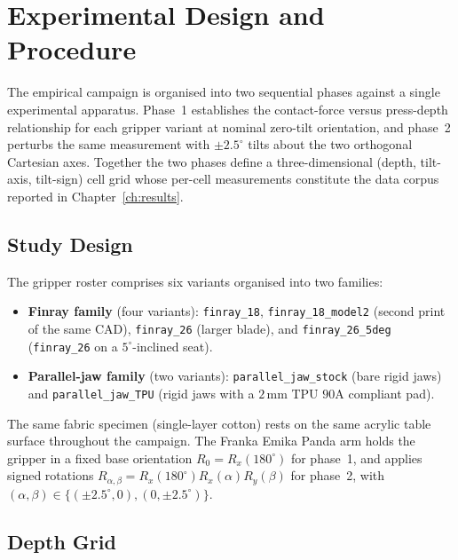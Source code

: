 \chapter{\rm\bfseries Experimental Design and Procedure}
\label{ch:experiments}

The empirical campaign is organised into two sequential phases against a
single experimental apparatus. Phase~1 establishes the contact-force
versus press-depth relationship for each gripper variant at nominal
zero-tilt orientation, and phase~2 perturbs the same measurement with
$\pm 2.5^{\circ}$ tilts about the two orthogonal Cartesian axes.
Together the two phases define a three-dimensional
(depth, tilt-axis, tilt-sign) cell grid whose per-cell measurements
constitute the data corpus reported in Chapter~\ref{ch:results}.

\section{Study Design}
\label{sec:study-design}

The gripper roster comprises six variants organised into two families:
\begin{itemize}
  \item \textbf{Finray family} (four variants):
    \texttt{finray\_18}, \texttt{finray\_18\_model2} (second print of
    the same CAD), \texttt{finray\_26} (larger blade), and
    \texttt{finray\_26\_5deg} (\texttt{finray\_26} on a
    $5^{\circ}$-inclined seat).
  \item \textbf{Parallel-jaw family} (two variants):
    \texttt{parallel\_jaw\_stock} (bare rigid jaws) and
    \texttt{parallel\_jaw\_TPU} (rigid jaws with a $2$\,mm TPU $90$A
    compliant pad).
\end{itemize}

The same fabric specimen (single-layer cotton) rests on the same
acrylic table surface throughout the campaign. The Franka Emika Panda
arm holds the gripper in a fixed base orientation $R_0 = R_x(180^{\circ})$
for phase~1, and applies signed rotations
$R_{\alpha,\beta} = R_x(180^{\circ}) R_x(\alpha) R_y(\beta)$
for phase~2, with $(\alpha, \beta) \in
\{(\pm 2.5^{\circ}, 0), (0, \pm 2.5^{\circ})\}$.

\section{Depth Grid}
\label{sec:depth-grid}

